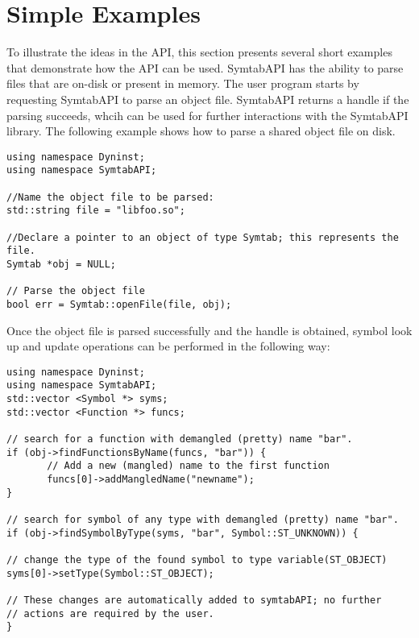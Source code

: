 \section{Simple Examples}

To illustrate the ideas in the API, this section presents several short examples
that demonstrate how the API can be used.  SymtabAPI has the ability to parse
files that are on-disk or present in memory. The user program starts by
requesting SymtabAPI to parse an object file. SymtabAPI returns a handle if the
parsing succeeds, whcih can be used for further interactions with the SymtabAPI
library. The following example shows how to parse a shared object file on disk.

\lstset{numbers=left, numberstyle=\tiny, stepnumber=5, numbersep=5pt}
\begin{lstlisting}
using namespace Dyninst;
using namespace SymtabAPI;

//Name the object file to be parsed:
std::string file = "libfoo.so";

//Declare a pointer to an object of type Symtab; this represents the file.
Symtab *obj = NULL;

// Parse the object file
bool err = Symtab::openFile(file, obj);
\end{lstlisting}

Once the object file is parsed successfully and the handle is obtained, symbol look up and update operations can be performed in the following way:

\begin{lstlisting}
using namespace Dyninst;
using namespace SymtabAPI;
std::vector <Symbol *> syms;
std::vector <Function *> funcs;

// search for a function with demangled (pretty) name "bar".
if (obj->findFunctionsByName(funcs, "bar")) {
       // Add a new (mangled) name to the first function
       funcs[0]->addMangledName("newname");
}

// search for symbol of any type with demangled (pretty) name "bar".
if (obj->findSymbolByType(syms, "bar", Symbol::ST_UNKNOWN)) {

// change the type of the found symbol to type variable(ST_OBJECT)
syms[0]->setType(Symbol::ST_OBJECT);

// These changes are automatically added to symtabAPI; no further
// actions are required by the user.
}
\end{lstlisting}

